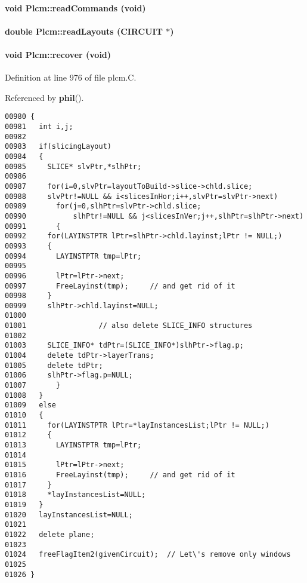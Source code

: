 \paragraph{\setlength{\rightskip}{0pt plus 5cm}void Plcm::read\-Commands (void)\hspace{0.3cm}{\tt  [private]}}\hfill

\label{Plcm_c2}
\paragraph{\setlength{\rightskip}{0pt plus 5cm}double Plcm::read\-Layouts (CIRCUIT $\ast$)\hspace{0.3cm}{\tt  [private]}}\hfill

\label{Plcm_a7}
\paragraph{\setlength{\rightskip}{0pt plus 5cm}void Plcm::recover (void)}\hfill



Definition at line 976 of file plcm.C.

Referenced by {\bf phil}().\small\begin{verbatim}00980 {
00981   int i,j;
00982 
00983   if(slicingLayout)
00984   {
00985     SLICE* slvPtr,*slhPtr;
00986 
00987     for(i=0,slvPtr=layoutToBuild->slice->chld.slice;
00988     slvPtr!=NULL && i<slicesInHor;i++,slvPtr=slvPtr->next)
00989       for(j=0,slhPtr=slvPtr->chld.slice;
00990           slhPtr!=NULL && j<slicesInVer;j++,slhPtr=slhPtr->next)
00991       {
00992     for(LAYINSTPTR lPtr=slhPtr->chld.layinst;lPtr != NULL;)
00993     {
00994       LAYINSTPTR tmp=lPtr;
00995       
00996       lPtr=lPtr->next;
00997       FreeLayinst(tmp);     // and get rid of it
00998     }
00999     slhPtr->chld.layinst=NULL;
01000 
01001                 // also delete SLICE_INFO structures
01002 
01003     SLICE_INFO* tdPtr=(SLICE_INFO*)slhPtr->flag.p;
01004     delete tdPtr->layerTrans;
01005     delete tdPtr;
01006     slhPtr->flag.p=NULL;
01007       }
01008   }
01009   else
01010   {
01011     for(LAYINSTPTR lPtr=*layInstancesList;lPtr != NULL;)
01012     {
01013       LAYINSTPTR tmp=lPtr;
01014       
01015       lPtr=lPtr->next;
01016       FreeLayinst(tmp);     // and get rid of it
01017     }
01018     *layInstancesList=NULL;
01019   }
01020   layInstancesList=NULL;
01021 
01022   delete plane;
01023 
01024   freeFlagItem2(givenCircuit);  // Let\'s remove only windows
01025   
01026 }
\end{verbatim}\normalsize 
\label{Plcm_c15}
